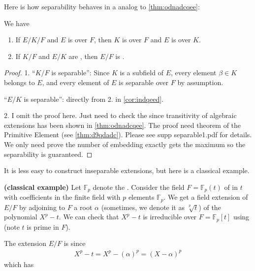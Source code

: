 \documentclass{article}
\newcommand{\bfs}[1]{\textbf{({#1}) }}
\begin{document}
Here is how separability behaves in a  analog to \cref{thm:odnadcqee}:
\begin{lema}\label{lem:ondaee}We have
\begin{enumerate}
    \item If $E / K / F$ and $E$ is  over $F$, then $K$ is  over $F$ and $E$ is  over $K$.
    \item {} If $K / F$ and $E / K$ are , then $E / F$ is .
\end{enumerate}

\end{lema}
\begin{proof}
1. 
``$K / F$ is separable'':  Since $K$ is a subfield of $E$, every element $\beta \in K$ belongs to $E$, and every element of $E$ is separable over $F$ by assumption.

``$E / K$ is separable'': directly from 2. in \cref{cor:indqeed}.


2. I omit the proof here. Just need to check the  since transitivity of algebraic extensions has been shown in \cref{thm:odnadcqee}. The proof need theorem of the Primitive Element (see \cref{thm:d9qdadc}). Please see supp separable1.pdf for details. We only need prove the number of embedding exactly gets the maximum so the separability is guaranteed.
\end{proof} 




It is less easy to construct inseparable extensions, but here is a classical example.
\begin{exma}\bfs{classical example}
Let $\mathbb{F}_{p}$ denote the . Consider the field $F=\mathbb{F}_{p}(t)$ of  in $t$ with coefficients in the finite field with $p$ elements $\mathbb{F}_{p}$. We get a field extension of $E / F$ by adjoining to $F$ a root $\alpha$ (sometimes, we denote it as $\sqrt[p]{t}$) of the polynomial $X^{p}-t$.  We can check that $X^{p}-t$ is irreducible over $F=\mathbb{F}_{p}[t]$ using (note $t$ is prime in $F$).

The extension $E / F$ is  since
\begin{align*}
X^{p}-t=X^{p}-(\alpha)^{p}=(X-\alpha)^{p}
\end{align*}
which has 
\end{exma}
\end{document}
